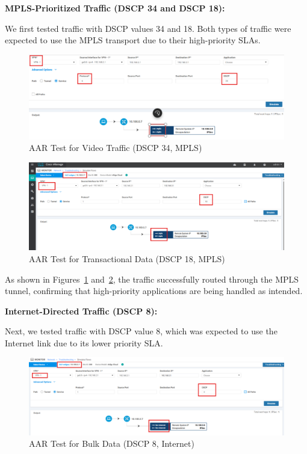 \documentclass[12pt,english]{report}
\begin{document}
\textbf{MPLS-Prioritized Traffic (DSCP 34 and DSCP 18):}

We first tested traffic with DSCP values 34 and 18. Both types of traffic were expected to use the MPLS transport due to their high-priority SLAs.

\begin{figure}[H]
    \centering
    \includegraphics[width=1\textwidth]{chapter 4/vpn1_34.png}
    \caption{AAR Test for Video Traffic (DSCP 34, MPLS)}
    \label{fig:aar_vpn10_mpls_34}
\end{figure}
\begin{figure}[H]
    \centering
    \includegraphics[width=1\textwidth]{chapter 4/vpn1_18.png}
    \caption{AAR Test for Transactional Data (DSCP 18, MPLS)}
    \label{fig:aar_vpn10_mpls_18}
\end{figure}

As shown in Figures~\ref{fig:aar_vpn10_mpls_34} and~\ref{fig:aar_vpn10_mpls_18}, the traffic successfully routed through the MPLS tunnel, confirming that high-priority applications are being handled as intended.

\textbf{Internet-Directed Traffic (DSCP 8):}

Next, we tested traffic with DSCP value 8, which was expected to use the Internet link due to its lower priority SLA.

\begin{figure}[H]
    \centering
    \includegraphics[width=1\textwidth]{chapter 4/vpn1_8.png}
    \caption{AAR Test for Bulk Data (DSCP 8, Internet)}
    \label{fig:aar_vpn10_internet_8}
\end{figure}
\end{document}
